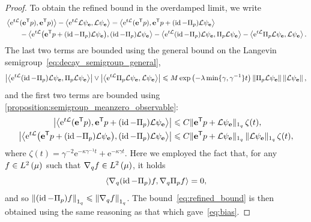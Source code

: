 \documentclass[11pt,a4paper]{article}
\DeclareMathOperator{\id}{id}
\newcommand{\e}{\mathrm{e}}
\newcommand{\grad}{\nabla}
\newcommand{\vect}[1]{\boldsymbol{\mathbf #1}}
\renewcommand{\t}{\mathsf T}
\theoremstyle{plain}
\numberwithin{equation}{section}
\renewcommand{\leq}{\leqslant}
\begin{document}
\begin{proof}
To obtain the refined bound in the overdamped limit,
we write
\begin{align*}
    &\ip{\e^{t \mathcal L}(\vect e^\t p)}{\vect e^\t p)} - \ip{\e^{t \mathcal L} \mathcal L \psi_{\vect e}}{\mathcal L \psi_{\vect e}}
      = \ip{\e^{t \mathcal L} (\vect e^\t p)}{\vect e^\t p + (\id - \Pi_p) \mathcal L \psi_{\vect e}} \\
      &\qquad - \ip{\e^{t \mathcal L} \bigl(\vect e^\t p + (\id - \Pi_p) \mathcal L \psi_{\vect e}\bigr)}{(\id - \Pi_p) \mathcal L \psi_{\vect e}}
      - \ip{\e^{t \mathcal L} (\id - \Pi_p) \mathcal L \psi_{\vect e}}{\Pi_p \mathcal L \psi_{\vect e}}
    - \ip{\e^{t \mathcal L} \Pi_p \mathcal L \psi_{\vect e}}{\mathcal L \psi_{\vect e}}.
\end{align*}
The last two terms are bounded using the general bound on the Langevin semigroup~\eqref{eq:decay_semigroup_general},
\[
    \abs{\ip{\e^{t \mathcal L} (\id - \Pi_p) \mathcal L \psi_{\vect e}}{\Pi_p \mathcal L \psi_{\vect e}}}
    \vee \abs{\ip{\e^{t \mathcal L} \Pi_p \mathcal L \psi_{\vect e}}{\mathcal L \psi_{\vect e}}}
    \leq M \exp \left( - \lambda \min\{\gamma, \gamma^{-1}\} t\right) \norm{\Pi_p \mathcal L \psi_{\vect e}} \norm{\mathcal L \psi_{\vect e}},
\]
and the first two terms are bounded using \cref{proposition:semigroup_meanzero_observable}:
\begin{align*}
    \abs{\ip{\e^{t \mathcal L} (\vect e^\t p)}{\vect e^\t p + (\id - \Pi_p) \mathcal L \psi_{\vect e}}}
    &\leq C \norm*{\vect e^\t p + \mathcal L \psi_{\vect e}}[1_q] \, \zeta(t), \\
    \abs{\ip{\e^{t \mathcal L} \bigl(\vect e^\t p + (\id - \Pi_p) \mathcal L \psi_{\vect e}\bigr)}{(\id - \Pi_p) \mathcal L \psi_{\vect e}}}
    &\leq C \norm*{\vect e^\t p + \mathcal L \psi_{\vect e}}[1_q] \, \norm*{\mathcal L \psi_{\vect e}}[1_q] \, \zeta(t),
\end{align*}
where $\zeta(t) = \gamma^{-2} \e^{- \kappa \gamma^{-1} t } + \e^{- \kappa \gamma t}$.
Here we employed the fact that, for any $f \in \lp{2}{\mu}$ such that $\grad_q f \in \lp{2}{\mu}$,
it holds
\[
    \ip{\grad_q (\id - \Pi_p) f}{\grad_q \Pi_p f} = 0,
\]
and so $\norm{(\id - \Pi_p) f}[1_q] \leq \norm{\grad_q f}[1_q]$.
The bound~\eqref{eq:refined_bound} is then obtained using the same reasoning as that which gave~\eqref{eq:bias}.
\end{proof}
\end{document}
